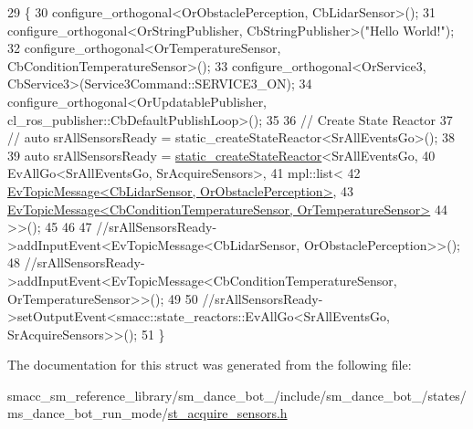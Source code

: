 \begin{DoxyCode}
29    \{
30       configure\_orthogonal<OrObstaclePerception, CbLidarSensor>();
31       configure\_orthogonal<OrStringPublisher, CbStringPublisher>(\textcolor{stringliteral}{"Hello World!"});
32       configure\_orthogonal<OrTemperatureSensor, CbConditionTemperatureSensor>();
33       configure\_orthogonal<OrService3, CbService3>(Service3Command::SERVICE3\_ON);
34       configure\_orthogonal<OrUpdatablePublisher, cl\_ros\_publisher::CbDefaultPublishLoop>();
35 
36       \textcolor{comment}{// Create State Reactor}
37       \textcolor{comment}{// auto srAllSensorsReady = static\_createStateReactor<SrAllEventsGo>();}
38 
39       \textcolor{keyword}{auto} srAllSensorsReady = \hyperlink{classsmacc_1_1SmaccState_a892be704b48f93bf5c35635d1a58ed54}{static\_createStateReactor}<SrAllEventsGo,
40                                                    EvAllGo<SrAllEventsGo, SrAcquireSensors>,
41                                                    mpl::list<
42                                                                
      \hyperlink{structsmacc_1_1default__events_1_1EvTopicMessage}{EvTopicMessage<CbLidarSensor, OrObstaclePerception>},
43                                                                
      \hyperlink{structsmacc_1_1default__events_1_1EvTopicMessage}{EvTopicMessage<CbConditionTemperatureSensor, OrTemperatureSensor>}
44                                                             >>();
45 
46       
47       \textcolor{comment}{//srAllSensorsReady->addInputEvent<EvTopicMessage<CbLidarSensor, OrObstaclePerception>>();}
48       \textcolor{comment}{//srAllSensorsReady->addInputEvent<EvTopicMessage<CbConditionTemperatureSensor,
       OrTemperatureSensor>>();}
49 
50       \textcolor{comment}{//srAllSensorsReady->setOutputEvent<smacc::state\_reactors::EvAllGo<SrAllEventsGo,
       SrAcquireSensors>>();}
51    \}
\end{DoxyCode}


The documentation for this struct was generated from the following file\+:\begin{DoxyCompactItemize}
\item 
smacc\+\_\+sm\+\_\+reference\+\_\+library/sm\+\_\+dance\+\_\+bot\+\_/include/sm\+\_\+dance\+\_\+bot\+\_/states/ms\+\_\+dance\+\_\+bot\+\_\+run\+\_\+mode/\hyperlink{2_2include_2sm__dance__bot__2_2states_2ms__dance__bot__run__mode_2st__acquire__sensors_8h}{st\+\_\+acquire\+\_\+sensors.\+h}\end{DoxyCompactItemize}
